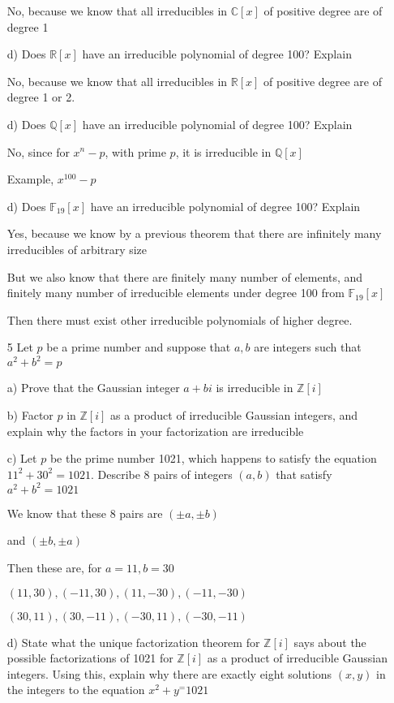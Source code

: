 \documentclass[12pt]{article}
\begin{document}
\begin{itemize}
		No, because we know that all irreducibles in $\mathbb{C}[x]$ of positive degree are of degree 1 

		d) Does $\mathbb{R}[x]$ have an irreducible polynomial of degree 100? Explain

		No, because we know that all irreducibles in $\mathbb{R}[x]$ of positive degree are of degree 1 or 2.

		d) Does $\mathbb{Q}[x]$ have an irreducible polynomial of degree 100? Explain

		No, since for $x^n - p$, with prime $p$, it is irreducible in $\mathbb{Q}[x]$

		Example, $x^{100} - p$

		d) Does $\mathbb{F}_{19}[x]$ have an irreducible polynomial of degree 100? Explain

		Yes, because we know by a previous theorem that there are infinitely many irreducibles of arbitrary size

		But we also know that there are finitely many number of elements, and finitely many number of irreducible elements under degree 100 from $\mathbb{F}_{19}[x]$

		Then there must exist other irreducible polynomials of higher degree.

	\item[5] Let $p$ be a prime number and suppose that $a, b$ are integers such that $a^2 + b^2 = p$

		a) Prove that the Gaussian integer $a+bi$ is irreducible in $\mathbb{Z}[i]$

		b) Factor $p$ in $\mathbb{Z}[i]$ as a product of irreducible Gaussian integers, and explain why the factors in your factorization are irreducible

		c) Let $p$ be the prime number 1021, which happens to satisfy the equation $11^2 + 30^2 = 1021$. Describe 8 pairs of integers $(a,b)$ that satisfy $a^2 + b^2 = 1021$

		We know that these 8 pairs are $(\pm a, \pm b)$ 
		
		and $(\pm b, \pm a)$

		Then these are, for $a = 11, b = 30$

		$(11, 30), (-11, 30), (11,-30), (-11,-30)$

		$(30, 11), (30, -11), (-30, 11), (-30, -11)$

		d) State what the unique factorization theorem for $\mathbb{Z}[i]$ says about the possible factorizations of 1021 for $\mathbb{Z}[i]$ as a product of irreducible Gaussian integers. Using this, explain why there are exactly eight solutions $(x,y)$ in the integers to the equation $x^2 + y^ = 1021$


\end{itemize}
\end{document}
